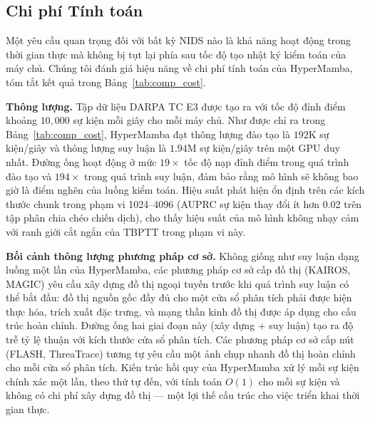 \documentclass[letterpaper,twocolumn,10pt]{article}
\begin{document}
\subsection{Chi phí Tính toán}
\label{sec:computational_cost}

Một yêu cầu quan trọng đối với bất kỳ NIDS nào là khả năng hoạt động trong thời gian thực mà không bị tụt lại phía sau tốc độ tạo nhật ký kiểm toán của máy chủ. Chúng tôi đánh giá hiệu năng về chi phí tính toán của HyperMamba, tóm tắt kết quả trong Bảng~\ref{tab:comp_cost}.

\begin{table}[h]
    \centering
    \caption{Chi phí Tính toán và Thông lượng}
    \label{tab:comp_cost}
\end{table}

\textbf{Thông lượng.} Tập dữ liệu DARPA TC E3 được tạo ra với tốc độ đỉnh điểm khoảng $10,000$ sự kiện mỗi giây cho mỗi máy chủ. Như được chỉ ra trong Bảng~\ref{tab:comp_cost}, HyperMamba đạt thông lượng đào tạo là $192$K sự kiện/giây và thông lượng suy luận là $1.94$M sự kiện/giây trên một GPU duy nhất. Đường ống hoạt động ở mức $19\times$ tốc độ nạp đỉnh điểm trong quá trình đào tạo và $194\times$ trong quá trình suy luận, đảm bảo rằng mô hình sẽ không bao giờ là điểm nghẽn của luồng kiểm toán. Hiệu suất phát hiện ổn định trên các kích thước chunk trong phạm vi 1024--4096 (AUPRC sự kiện thay đổi ít hơn 0.02 trên tập phân chia chéo chiến dịch), cho thấy hiệu suất của mô hình không nhạy cảm với ranh giới cắt ngắn của TBPTT trong phạm vi này.

\textbf{Bối cảnh thông lượng phương pháp cơ sở.} Không giống như suy luận dạng luồng một lần của HyperMamba, các phương pháp cơ sở cấp đồ thị (KAIROS, MAGIC) yêu cầu xây dựng đồ thị ngoại tuyến trước khi quá trình suy luận có thể bắt đầu: đồ thị nguồn gốc đầy đủ cho một cửa sổ phân tích phải được hiện thực hóa, trích xuất đặc trưng, và mạng thần kinh đồ thị được áp dụng cho cấu trúc hoàn chỉnh. Đường ống hai giai đoạn này (xây dựng + suy luận) tạo ra độ trễ tỷ lệ thuận với kích thước cửa sổ phân tích. Các phương pháp cơ sở cấp nút (FLASH, ThreaTrace) tương tự yêu cầu một ảnh chụp nhanh đồ thị hoàn chỉnh cho mỗi cửa sổ phân tích. Kiến trúc hồi quy của HyperMamba xử lý mỗi sự kiện chính xác một lần, theo thứ tự đến, với tính toán $O(1)$ cho mỗi sự kiện và không có chi phí xây dựng đồ thị --- một lợi thế cấu trúc cho việc triển khai thời gian thực.
\end{document}
